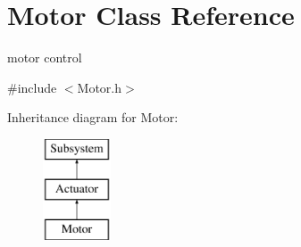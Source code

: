 \hypertarget{classMotor}{\section{Motor Class Reference}
\label{classMotor}
}


motor control  




{\ttfamily \#include $<$Motor.\-h$>$}

Inheritance diagram for Motor\-:\begin{figure}[H]
\begin{center}
\leavevmode
\includegraphics[height=3.000000cm]{classMotor}
\end{center}
\end{figure}
